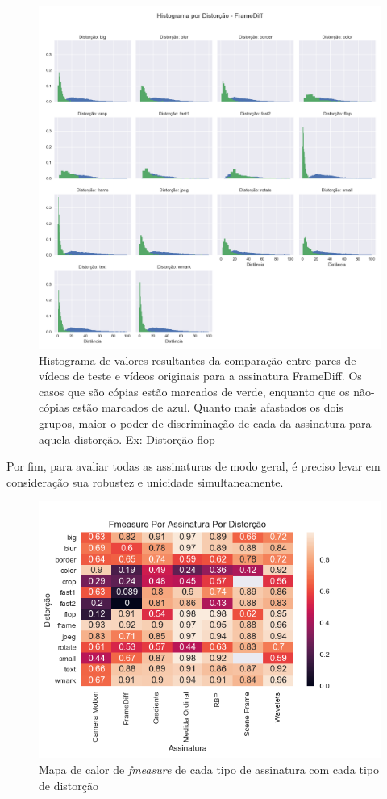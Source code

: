\begin{figure}[h]
	\centering
	\caption{Histograma de valores resultantes da comparação entre pares de vídeos de teste e vídeos originais para a assinatura FrameDiff. Os casos que são cópias estão marcados de verde, enquanto que os não-cópias estão marcados de azul. Quanto mais afastados os dois grupos, maior o poder de discriminação de cada da assinatura para aquela distorção. Ex: Distorção flop}
	\label{fig:histograma-framediff}
	\includegraphics[width=\textwidth]{dados/figuras/experimentos/histograma_distorcao_FrameDiff.png}
\end{figure}

Por fim, para avaliar todas as assinaturas de modo geral, é preciso levar em consideração sua robustez e unicidade simultaneamente. 

\begin{figure}[h]
	\centering
	\caption{Mapa de calor de \textit{fmeasure} de cada tipo de assinatura com cada tipo de distorção}
	\label{fig:heatmap-final_f1}
	\includegraphics[width=\textwidth]{dados/figuras/experimentos/heatmap_final_f1.png}
\end{figure}

